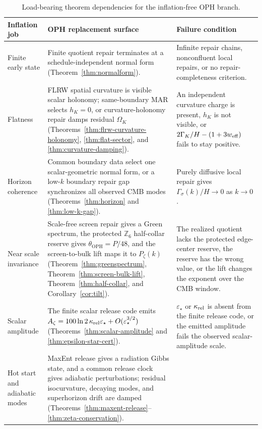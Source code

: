 \documentclass[11pt]{article}
\newcommand{\OPH}{\mathrm{OPH}}
\newcommand{\Zsix}{\mathbb Z_6}
\begin{document}
\begingroup
\small
\begin{longtable}{@{}p{}p{}p{}@{}}
\caption{Load-bearing theorem dependencies for the inflation-free OPH branch.}\label{tab:theorem-dependencies}\\
\toprule
Inflation job & OPH replacement surface & Failure condition\\
\midrule
\endhead
\bottomrule
\endfoot
Finite early state &
Finite quotient repair terminates at a schedule-independent normal form
(Theorem~\ref{thm:normalform}). &
Infinite repair chains, nonconfluent local repairs, or no repair-completeness criterion.\\
Flatness &
FLRW spatial curvature is visible scalar holonomy; same-boundary MAR selects \(h_K=0\), or
curvature-holonomy repair damps residual \(\Omega_K\)
(Theorems~\ref{thm:flrw-curvature-holonomy}, \ref{thm:flat-sector}, and
\ref{thm:curvature-damping}). &
An independent curvature charge is present, \(h_K\) is not visible, or
\(2\Gamma_K/H-(1+3w_{\rm eff})\) fails to stay positive.\\
Horizon coherence &
Common boundary data select one scalar-geometric normal form, or a low-\(k\) boundary repair gap
synchronizes all observed CMB modes
(Theorems~\ref{thm:horizon} and \ref{thm:low-k-gap}). &
Purely diffusive local repair gives \(\Gamma_\sigma(k)/H\to0\) as \(k\to0\).\\
Near scale invariance &
Scale-free screen repair gives a Green spectrum, the protected \(\Zsix\) half-collar reserve gives
\(\theta_{\OPH}=P/48\), and the screen-to-bulk lift maps it to \(P_\zeta(k)\)
(Theorem~\ref{thm:greenspectrum}, Theorem~\ref{thm:screen-bulk-lift},
Theorem~\ref{thm:half-collar}, and Corollary~\ref{cor:tilt}). &
The realized quotient lacks the protected edge-center reserve, the reserve has the wrong value, or the lift changes the
exponent over the CMB window.\\
Scalar amplitude &
The finite scalar release code emits \(A_\zeta=100\ln2\,\kappa_{\rm rel}\varepsilon_\star
+O(\varepsilon_\star^{3/2})\)
(Theorems~\ref{thm:scalar-amplitude} and \ref{thm:epsilon-star-cert}). &
\(\varepsilon_\star\) or \(\kappa_{\rm rel}\) is absent from the finite release code, or the emitted
amplitude fails the observed scalar-amplitude scale.\\
Hot start and adiabatic modes &
MaxEnt release gives a radiation Gibbs state, and a common release clock gives adiabatic
perturbations; residual isocurvature, decaying modes, and superhorizon drift are damped
(Theorems~\ref{thm:maxent-release}--\ref{thm:zeta-conservation}). &

\end{longtable}
\end{document}
